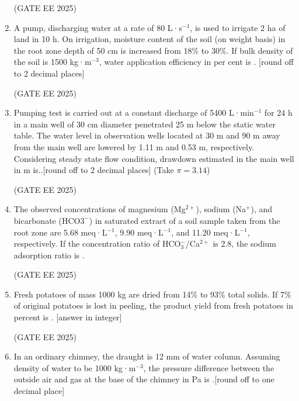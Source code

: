 \documentclass[journal,12pt,onecolumn]{IEEEtran}
\theoremstyle{remark}
\begin{document}
\begin{enumerate}
\hfill(GATE EE 2025)

\item A pump, discharging water at a rate of 80 L·s$^{-1}$, is used to irrigate 2 ha of land in 10 h. On irrigation, moisture content of the soil (on weight basis) in the root zone depth of 50 cm is increased from 18\% to 30\%. If bulk density of the soil is 1500 kg·m$^{-3}$, water application efficiency in per cent is \underline{\hspace{2cm}}. {[round off to 2 decimal places]}

\hfill(GATE EE 2025)

\item Pumping test is carried out at a constant discharge of 5400 L·min$^{-1}$ for 24 h in a main well of 30 cm diameter penetrated 25 m below the static water table. The water level in observation wells located at 30 m and 90 m away from the main well are lowered by 1.11 m and 0.53 m, respectively. Considering steady state flow condition, drawdown estimated in the main well in m is.\underline{\hspace{2cm}}.{[round off to 2 decimal places] (Take $\pi = 3.14$)}

\hfill(GATE EE 2025)

\item The observed concentrations of magnesium (Mg$^{2+}$), sodium (Na$^{+}$), and bicarbonate (HCO$3^-$) in saturated extract of a soil sample taken from the root zone are 5.68 meq·L$^{-1}$, 9.90 meq·L$^{-1}$, and 11.20 meq·L$^{-1}$, respectively. If the concentration ratio of HCO$_3^-$/Ca$^{2+}$ is 2.8, the sodium adsorption ratio is \underline{\hspace{2cm}} .  

\hfill(GATE EE 2025)

\item Fresh potatoes of mass 1000 kg are dried from 14\% to 93\% total solids. If 7\% of original potatoes is lost in peeling, the product yield from fresh potatoes in percent is \underline{\hspace{2cm}}. {[answer in integer]}

\hfill(GATE EE 2025)

\item In an ordinary chimney, the draught is 12 mm of water column. Assuming density of water to be 1000 kg·m$^{-3}$, the pressure difference between the outside air and gas at the base of the chimney in Pa is \underline{\hspace{2cm}}.{[round off to one decimal place]}


\end{enumerate}
\end{document}
